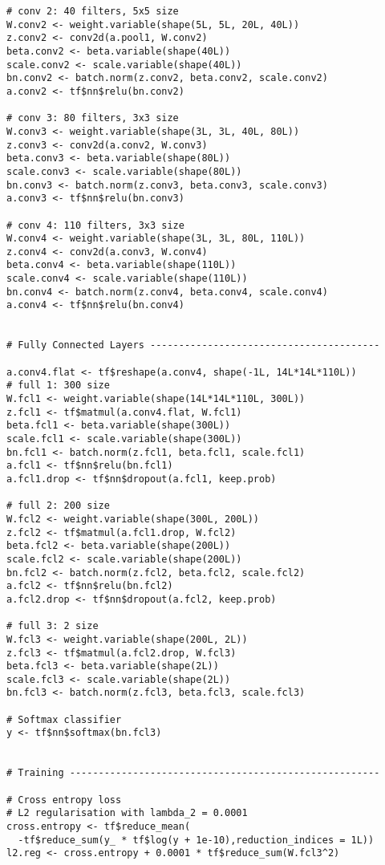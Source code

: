 \begin{appendices}
\begin{verbatim}
# conv 2: 40 filters, 5x5 size
W.conv2 <- weight.variable(shape(5L, 5L, 20L, 40L))
z.conv2 <- conv2d(a.pool1, W.conv2)
beta.conv2 <- beta.variable(shape(40L))
scale.conv2 <- scale.variable(shape(40L))
bn.conv2 <- batch.norm(z.conv2, beta.conv2, scale.conv2)
a.conv2 <- tf$nn$relu(bn.conv2)

# conv 3: 80 filters, 3x3 size
W.conv3 <- weight.variable(shape(3L, 3L, 40L, 80L))
z.conv3 <- conv2d(a.conv2, W.conv3)
beta.conv3 <- beta.variable(shape(80L))
scale.conv3 <- scale.variable(shape(80L))
bn.conv3 <- batch.norm(z.conv3, beta.conv3, scale.conv3)
a.conv3 <- tf$nn$relu(bn.conv3)

# conv 4: 110 filters, 3x3 size
W.conv4 <- weight.variable(shape(3L, 3L, 80L, 110L))
z.conv4 <- conv2d(a.conv3, W.conv4)
beta.conv4 <- beta.variable(shape(110L))
scale.conv4 <- scale.variable(shape(110L))
bn.conv4 <- batch.norm(z.conv4, beta.conv4, scale.conv4)
a.conv4 <- tf$nn$relu(bn.conv4)


# Fully Connected Layers ----------------------------------------

a.conv4.flat <- tf$reshape(a.conv4, shape(-1L, 14L*14L*110L))
# full 1: 300 size
W.fcl1 <- weight.variable(shape(14L*14L*110L, 300L))
z.fcl1 <- tf$matmul(a.conv4.flat, W.fcl1)
beta.fcl1 <- beta.variable(shape(300L))
scale.fcl1 <- scale.variable(shape(300L))
bn.fcl1 <- batch.norm(z.fcl1, beta.fcl1, scale.fcl1)
a.fcl1 <- tf$nn$relu(bn.fcl1)
a.fcl1.drop <- tf$nn$dropout(a.fcl1, keep.prob)

# full 2: 200 size
W.fcl2 <- weight.variable(shape(300L, 200L))
z.fcl2 <- tf$matmul(a.fcl1.drop, W.fcl2)
beta.fcl2 <- beta.variable(shape(200L))
scale.fcl2 <- scale.variable(shape(200L))
bn.fcl2 <- batch.norm(z.fcl2, beta.fcl2, scale.fcl2)
a.fcl2 <- tf$nn$relu(bn.fcl2)
a.fcl2.drop <- tf$nn$dropout(a.fcl2, keep.prob)

# full 3: 2 size
W.fcl3 <- weight.variable(shape(200L, 2L))
z.fcl3 <- tf$matmul(a.fcl2.drop, W.fcl3)
beta.fcl3 <- beta.variable(shape(2L))
scale.fcl3 <- scale.variable(shape(2L))
bn.fcl3 <- batch.norm(z.fcl3, beta.fcl3, scale.fcl3)

# Softmax classifier
y <- tf$nn$softmax(bn.fcl3)


# Training ------------------------------------------------------

# Cross entropy loss
# L2 regularisation with lambda_2 = 0.0001
cross.entropy <- tf$reduce_mean(
  -tf$reduce_sum(y_ * tf$log(y + 1e-10),reduction_indices = 1L))
l2.reg <- cross.entropy + 0.0001 * tf$reduce_sum(W.fcl3^2)


\end{verbatim}
\end{appendices}
